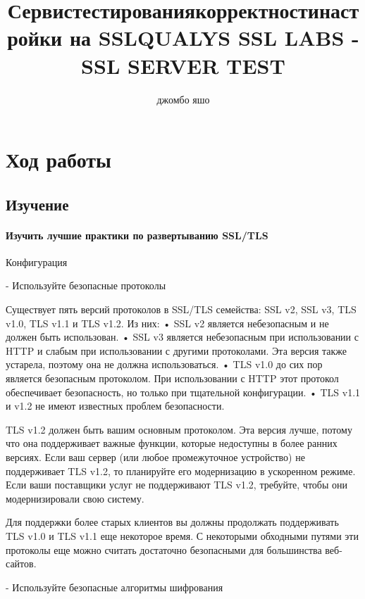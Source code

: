 \documentclass[10pt,a4paper]{article}
\author{джомбо яшо}
\title{Сервистестированиякорректностинастройки на SSLQUALYS SSL LABS - SSL SERVER TEST}
\begin{document}
\maketitle

\section{Ход работы}
\subsection{Изучение}

\paragraph{ Изучить лучшие практики по развертыванию SSL/TLS}

 Конфигурация

- Используйте безопасные протоколы

Существует пять версий протоколов в SSL/TLS семейства: SSL v2, SSL v3, TLS v1.0, TLS v1.1 и TLS v1.2. Из них:
• SSL v2 является небезопасным и не должен быть использован. 
• SSL v3 является небезопасным при использовании с HTTP и слабым при использовании с другими протоколами. Эта версия также устарела, поэтому она не должна использоваться.
• TLS v1.0 до сих пор является безопасным протоколом. При использовании с HTTP этот протокол обеспечивает безопасность, но только при тщательной конфигурации.
• TLS v1.1 и v1.2 не имеют известных проблем безопасности.

TLS v1.2 должен быть вашим основным протоколом. Эта версия лучше, потому что она поддерживает важные функции, которые недоступны в более ранних версиях. Если ваш сервер (или любое промежуточное устройство) не поддерживает TLS v1.2, то планируйте его модернизацию в ускоренном режиме. Если ваши поставщики услуг не поддерживают TLS v1.2, требуйте, чтобы они модернизировали свою систему.

Для поддержки более старых клиентов вы должны продолжать поддерживать TLS v1.0 и TLS v1.1 еще некоторое время. С некоторыми обходными путями эти протоколы еще можно считать достаточно безопасными для большинства веб-сайтов.

- Используйте безопасные алгоритмы шифрования
\end{document}

